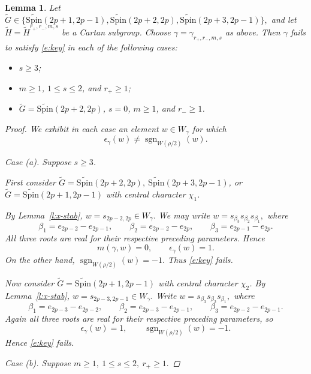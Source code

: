 \documentclass{amsart}
\newcommand{\Spin}{{\mathrm{Spin}}}
\newtheorem{lemma}[thm]{Lemma}
\theoremstyle{definition}
\begin{document}
\begin{lemma}\label{l:D-ruleout}
Let $\widetilde G\in
\{
\widetilde{\Spin}(2p+1,2p-1),
\widetilde{\Spin}(2p+2,2p),
\widetilde{\Spin}(2p+3,2p-1)
\},$
and let
$\widetilde H=\widetilde H^{r_+,r_-,m,s}$
be a Cartan subgroup. Choose
\(\gamma=\gamma_{r_+,r_-,m,s}\)
as above. Then \(\gamma\) fails to satisfy \eqref{e:key} in each of
the following cases:
\begin{itemize}
\item[(a)] \(s\geq3\);
\item[(b)] \(m\geq1\), \(1\leq s\leq2\), and \(r_+\geq1\);
\item[(c)] \(\widetilde G=\widetilde{\Spin}(2p+2,2p)\),
\(s=0\), \(m\geq1\), and \(r_-\geq1\).
\end{itemize}

\begin{proof}
We exhibit in each case an element \(w\in W_\gamma\) for which
\[
\epsilon_\gamma(w)
\neq
\operatorname{sgn}_{W(\rho/2)}(w).
\]

\smallskip

\noindent
\textit{Case (a).}
Suppose \(s\geq3\).

First consider $\widetilde G=\widetilde{\Spin}(2p+2,2p),
\ \widetilde{\Spin}(2p+3,2p-1)$, or 
$\widetilde G=\widetilde{\Spin}(2p+1,2p-1)$
with central character \(\chi_1\).

By Lemma~\ref{l:x-stab},
$w=s_{2p-2,2p}\in W_\gamma.$
We may write
$w=s_{\beta_3}s_{\beta_2}s_{\beta_1},$
where
\[
\beta_1=e_{2p-2}-e_{2p-1},\qquad
\beta_2=e_{2p-2}-e_{2p},\qquad
\beta_3=e_{2p-1}-e_{2p}.
\]
All three roots are real for their respective preceding parameters.
Hence
\[
m(\gamma,w)=0,
\qquad
\epsilon_\gamma(w)=1.
\]
On the other hand,
$\operatorname{sgn}_{W(\rho/2)}(w)=-1.$
Thus \eqref{e:key} fails.

Now consider
$\widetilde G=\widetilde{\Spin}(2p+1,2p-1)$
with central character \(\chi_2\). By Lemma~\ref{l:x-stab},
$w=s_{2p-3,2p-1}\in W_\gamma.$
Write
$w=s_{\beta_3}s_{\beta_2}s_{\beta_1},$
where
\[
\beta_1=e_{2p-3}-e_{2p-2},\qquad
\beta_2=e_{2p-3}-e_{2p-1},\qquad
\beta_3=e_{2p-2}-e_{2p-1}.
\]
Again all three roots are real for their respective preceding
parameters, so
\[
\epsilon_\gamma(w)=1,
\qquad
\operatorname{sgn}_{W(\rho/2)}(w)=-1.
\]
Hence \eqref{e:key} fails.

\smallskip

\noindent
\textit{Case (b).}
Suppose
$m\geq1,\  1\leq s\leq2,\  r_+\geq1.$


\end{proof}
\end{lemma}
\end{document}
